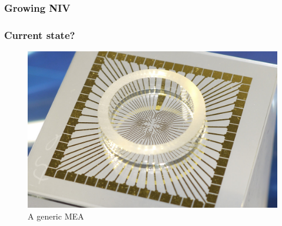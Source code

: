 \subsubsection{Growing NIV}
\subsubsection{Current state?}
\begin{figure}[h!]
    \includegraphics[width=\linewidth]{images/MEA.jpg}
    \caption{A generic MEA}
    \label{fig:generic_MEA}
\end{figure}

